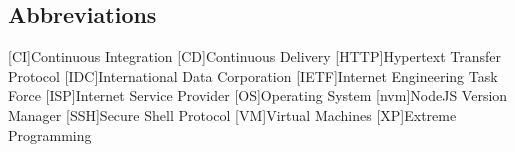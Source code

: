 \newcommand{\abbr}{Abbreviations}
\subsection{Abbreviations}

\begin{acronym}[1234567890abcd]		%
\setlength{\itemsep}{-\parsep}	%

[CI]{Continuous Integration}
[CD]{Continuous Delivery}
[HTTP]{Hypertext Transfer Protocol}
[IDC]{International Data Corporation}
[IETF]{Internet Engineering Task Force}
[ISP]{Internet Service Provider}
[OS]{Operating System}
[nvm]{NodeJS Version Manager}
[SSH]{Secure Shell Protocol}
[VM]{Virtual Machines}
[XP]{Extreme Programming}
\end{acronym}